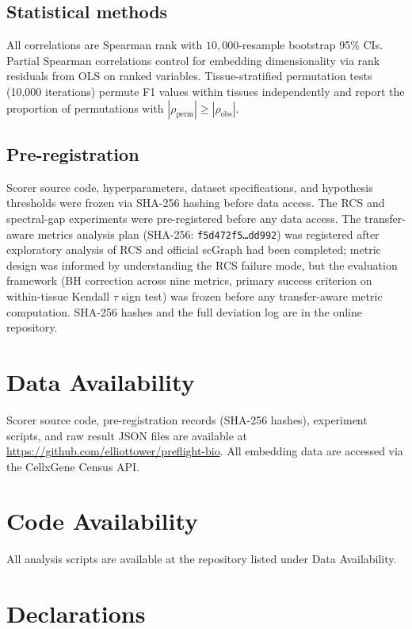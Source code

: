 \documentclass[11pt]{article}
\begin{document}
\subsection{Statistical methods}

All correlations are Spearman rank with $10{,}000$-resample bootstrap
95\% CIs. Partial Spearman correlations control for embedding
dimensionality via rank residuals from OLS on ranked variables.
Tissue-stratified permutation tests (10,000 iterations) permute F1
values within tissues independently and report the proportion of
permutations with $|\rho_{\mathrm{perm}}| \geq |\rho_{\mathrm{obs}}|$.

\subsection{Pre-registration}

Scorer source code, hyperparameters, dataset specifications, and
hypothesis thresholds were frozen via SHA-256 hashing before data
access. The RCS and spectral-gap experiments were pre-registered before
any data access. The transfer-aware metrics analysis plan (SHA-256:
\texttt{f5d472f5\ldots dd992}) was registered after exploratory analysis
of RCS and official scGraph had been completed; metric design was
informed by understanding the RCS failure mode, but the evaluation
framework (BH correction across nine metrics, primary success criterion
on within-tissue Kendall $\tau$ sign test) was frozen before any
transfer-aware metric computation. SHA-256 hashes and the full deviation log are in the online
repository.


\section*{Data Availability}

Scorer source code, pre-registration records (SHA-256 hashes),
experiment scripts, and raw result JSON files are available at
\url{https://github.com/elliottower/preflight-bio}. All embedding data
are accessed via the CellxGene Census API.

\section*{Code Availability}

All analysis scripts are available at the repository listed under Data
Availability.

\section*{Declarations}
\end{document}

